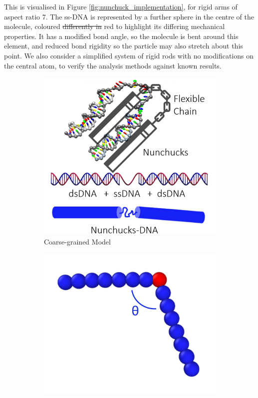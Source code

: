 \documentclass[11pt, a4paper]{article} %
\providecommand{\DIFdel}[1]{{\protect\color{red}\sout{#1}}}                      %
\providecommand{\DIFdelbegin}{} %
\providecommand{\DIFdelend}{} %
\begin{document}
This is visualised in Figure \ref{fig:nunchuck_implementation}, for rigid arms of aspect ratio 7. The ss-DNA is represented by a further sphere in the centre of the molecule, coloured \DIFdelbegin \DIFdel{differently in }\DIFdelend red to highlight its differing mechanical properties. It has a modified bond angle, so the molecule is bent around this element, and reduced bond rigidity so the particle may also stretch about this point. We also consider a simplified system of rigid rods with no modifications on the central atom, to verify the analysis methods against known results.

\begin{figure}[ht]
	\hfill  %
	\begin{subfigure}{.4\textwidth}
		\centering
		\includegraphics[width=\linewidth]{Figures/nunchucks_artist}  
		\caption{Coarse-grained Model}
		\label{fig:nunchuck_analogy}
	\end{subfigure}
	\hfill %
	\begin{subfigure}{.4\textwidth}
		\centering
		\includegraphics[width=\linewidth]{Figures/nunchuck_profile_coloured}  

\end{subfigure}
\end{figure}
\end{document}
